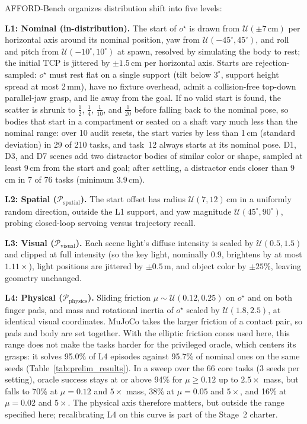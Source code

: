 \documentclass[conference]{IEEEtran}
\begin{document}
AFFORD-Bench organizes distribution shift into five levels:

\textbf{L1: Nominal (in-distribution).} The start of $o^\star$ is drawn from $\mathcal{U}(\pm 7\,\text{cm})$ per horizontal axis around its nominal position, yaw from $\mathcal{U}(-45^\circ, 45^\circ)$, and roll and pitch from $\mathcal{U}(-10^\circ, 10^\circ)$ at spawn, resolved by simulating the body to rest; the initial TCP is jittered by $\pm 1.5$\,cm per horizontal axis. Starts are rejection-sampled: $o^\star$ must rest flat on a single support (tilt below $3^\circ$, support height spread at most 2\,mm), have no fixture overhead, admit a collision-free top-down parallel-jaw grasp, and lie away from the goal. If no valid start is found, the scatter is shrunk to $\tfrac12$, $\tfrac14$, $\tfrac1{10}$, and $\tfrac1{20}$ before falling back to the nominal pose, so bodies that start in a compartment or seated on a shaft vary much less than the nominal range: over 10 audit resets, the start varies by less than 1\,cm (standard deviation) in 29 of 210 tasks, and task~12 always starts at its nominal pose. D1, D3, and D7 scenes add two distractor bodies of similar color or shape, sampled at least 9\,cm from the start and goal; after settling, a distractor ends closer than 9\,cm in 7 of 76 tasks (minimum 3.9\,cm).

\textbf{L2: Spatial ($\mathcal{P}_{\mathrm{spatial}}$).} The start offset has radius $\mathcal{U}(7, 12)$\,cm in a uniformly random direction, outside the L1 support, and yaw magnitude $\mathcal{U}(45^\circ, 90^\circ)$, probing closed-loop servoing versus trajectory recall.

\textbf{L3: Visual ($\mathcal{P}_{\mathrm{visual}}$).} Each scene light's diffuse intensity is scaled by $\mathcal{U}(0.5, 1.5)$ and clipped at full intensity (so the key light, nominally 0.9, brightens by at most $1.11\times$), light positions are jittered by $\pm 0.5\,\text{m}$, and object color by $\pm 25\%$, leaving geometry unchanged.

\textbf{L4: Physical ($\mathcal{P}_{\mathrm{physics}}$).} Sliding friction $\mu \sim \mathcal{U}(0.12, 0.25)$ on $o^\star$ and on both finger pads, and mass and rotational inertia of $o^\star$ scaled by $\mathcal{U}(1.8, 2.5)$, at identical visual coordinates. MuJoCo takes the larger friction of a contact pair, so pads and body are set together. With the elliptic friction cones used here, this range does not make the tasks harder for the privileged oracle, which centers its grasps: it solves 95.0\% of L4 episodes against 95.7\% of nominal ones on the same seeds (Table~\ref{tab:prelim_results}). In a sweep over the 66 core tasks (3 seeds per setting), oracle success stays at or above 94\% for $\mu \geq 0.12$ up to $2.5\times$ mass, but falls to 70\% at $\mu = 0.12$ and $5\times$ mass, 38\% at $\mu = 0.05$ and $5\times$, and 16\% at $\mu = 0.02$ and $5\times$. The physical axis therefore matters, but outside the range specified here; recalibrating L4 on this curve is part of the Stage~2 charter.
\end{document}

